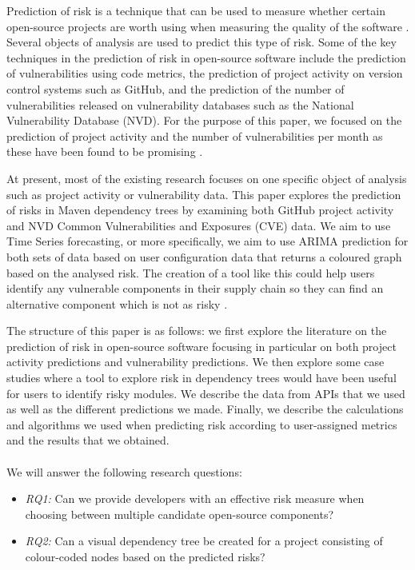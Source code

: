 \documentclass[conference]{IEEEtran}
\begin{document}
Prediction of risk is a technique that can be used to measure whether certain open-source projects are worth using when measuring the quality of the software \cite{abunadi_towards_2015}. Several objects of analysis are used to predict this type of risk. Some of the key techniques in the prediction of risk in open-source software include the prediction of vulnerabilities using code metrics, the prediction of project activity on version control systems such as GitHub, and the prediction of the number of vulnerabilities released on vulnerability databases such as the National Vulnerability Database (NVD). For the purpose of this paper, we focused on the prediction of project activity and the number of vulnerabilities per month as these have been found to be promising \cite{xia_predicting_2022, s_wu_vulnerability_2020}. 

At present, most of the existing research focuses on one specific object of analysis such as project activity or vulnerability data. This paper explores the prediction of risks in Maven dependency trees by examining both GitHub project activity and NVD Common Vulnerabilities and Exposures (CVE) data. We aim to use Time Series forecasting, or more specifically, we aim to use ARIMA prediction for both sets of data based on user configuration data that returns a coloured graph based on the analysed risk. The creation of a tool like this could help users identify any vulnerable components in their supply chain so they can find an alternative component which is not as risky \cite{noauthor_open_nodate}. 

The structure of this paper is as follows: we first explore the literature on the prediction of risk in open-source software focusing in particular on both project activity predictions and vulnerability predictions. We then explore some case studies where a tool to explore risk in dependency trees would have been useful for users to identify risky modules. We describe the data from APIs that we used as well as the different predictions we made. Finally, we describe the calculations and algorithms we used when predicting risk according to user-assigned metrics and the results that we obtained. 
\\\\
We will answer the following research questions:\\

\begin{itemize}
    \item \textit{RQ1:} Can we provide developers with an effective risk measure when choosing between multiple candidate open-source components?\\
    \item \textit{RQ2:} Can a visual dependency tree be created for a project consisting of colour-coded nodes based on the predicted risks?\\
\end{itemize}
\end{document}
